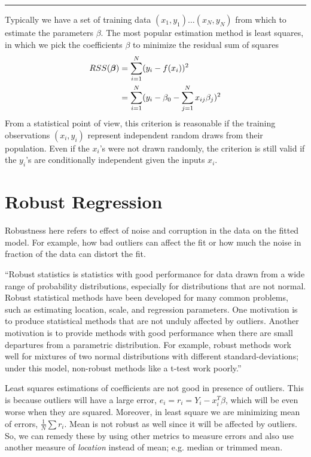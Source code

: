 \hrule
\vspace{.1in}
Typically we have a set of training data 
$(x_1, y_1) \dots (x_N , y_N)$ from which to estimate the 
parameters $\beta$. The most popular estimation
method is least squares, in which we pick the coefficients $\beta$ 
to minimize the residual sum of squares
\begin{gather} %
\begin{aligned}
RSS(\bbeta) &=  \sum_{i=1}^N (y_i - f(x_i))^2 \\ 
                   &=  \sum_{i=1}^N (y_i - \beta_0  - \sum_{j=1}^N x_{ij}\beta_j)^2\\ 
\end{aligned}
\end{gather} 
From a statistical point of view, this criterion is 
reasonable if the training observations $(x_i, y_i)$
represent independent random draws from their 
population. Even if the $x_i$'s were not drawn randomly, 
the criterion is still valid if the $y_i$'s are conditionally 
independent given the inputs $x_i$.



\section{Robust Regression}
\label{sec:Robust-Regression}
Robustness here refers to effect of noise
and corruption in the data on the fitted model.
For example, how bad outliers can affect the
fit or how much the noise in fraction of the data
can distort the fit.

``Robust statistics is statistics with good 
performance for data drawn from a wide 
range of probability distributions, especially 
for distributions that are not normal. Robust 
statistical methods have been developed for 
many common problems, such as estimating 
location, scale, and regression parameters. 
One motivation is to produce statistical 
methods that are not unduly affected by 
outliers. Another motivation is to provide 
methods with good performance when 
there are small departures from a parametric 
distribution. For example, robust methods 
work well for mixtures of two normal distributions 
with different standard-deviations; under this model, 
non-robust methods like a t-test work poorly.''\cite{robustWiki}

Least squares estimations of coefficients
are not good in presence of outliers. 
This is because outliers will have a large error,
$e_i=r_i=Y_i - x_i^T\beta$, which will be even worse
when they are squared. Moreover, in least square we are
minimizing mean of errors, $\frac{1}{N}\sum r_i$.
Mean is not robust as well since it will be affected by outliers.
So, we can remedy these by using other metrics to measure
errors and also use another measure of \emph{location} instead of
mean; e.g. median or trimmed mean.

